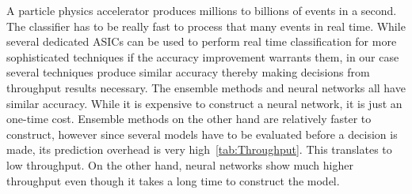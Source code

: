 A particle physics accelerator produces millions to billions of events in a second. The classifier has to be really fast to process that many events in real time. While several dedicated ASICs can be used to perform real time classification for more sophisticated techniques if the accuracy improvement warrants them, in our case several techniques produce similar accuracy thereby making decisions from throughput results necessary. The ensemble methods and neural networks all have similar accuracy. While it is expensive to construct a neural network, it is just an one-time cost. Ensemble methods on the other hand are relatively faster to construct, however since several models have to be evaluated before a decision is made, its prediction overhead is very high~\ref{tab:Throughput}. This translates to low throughput. On the other hand, neural networks show much higher throughput even though it takes a long time to construct the model.


\begin{table}[h]
\centering
\caption{Throughput results for different classifiers}
\label{tab:Throughput} 
\end{table}



